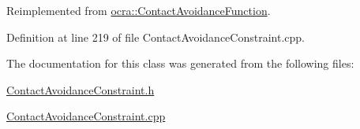 Reimplemented from \hyperlink{classocra_1_1ContactAvoidanceFunction_aca72dc43ecd3d95bb917139ac6ae19c1}{ocra\+::\+Contact\+Avoidance\+Function}.



Definition at line 219 of file Contact\+Avoidance\+Constraint.\+cpp.



The documentation for this class was generated from the following files\+:\begin{DoxyCompactItemize}
\item 
\hyperlink{ContactAvoidanceConstraint_8h}{Contact\+Avoidance\+Constraint.\+h}\item 
\hyperlink{ContactAvoidanceConstraint_8cpp}{Contact\+Avoidance\+Constraint.\+cpp}\end{DoxyCompactItemize}
